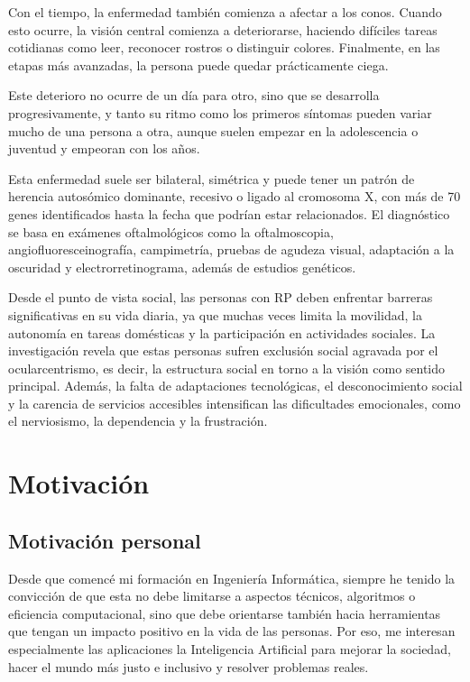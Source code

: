 \documentclass[11pt,spanish,listoffigures,listoftables]{tfgetsinf}
\begin{document}
Con el tiempo, la enfermedad también comienza a afectar a los conos. Cuando esto ocurre, la visión central comienza a deteriorarse, haciendo difíciles tareas cotidianas como leer, reconocer rostros o distinguir colores. Finalmente, en las etapas más avanzadas, la persona puede quedar prácticamente ciega. 

Este deterioro no ocurre de un día para otro, sino que se desarrolla progresivamente, y tanto su ritmo como los primeros síntomas pueden variar mucho de una persona a otra, aunque suelen empezar en la adolescencia o juventud y empeoran con los años. 

Esta enfermedad suele ser bilateral, simétrica y puede tener un patrón de herencia autosómico dominante, recesivo o ligado al cromosoma X, con más de 70 genes identificados hasta la fecha que podrían estar relacionados\cite{GIL}. El diagnóstico se basa en exámenes oftalmológicos como la oftalmoscopia, angiofluoresceinografía, campimetría, pruebas de agudeza visual, adaptación a la oscuridad y electrorretinograma, además de estudios genéticos\cite{VIS}.

Desde el punto de vista social, las personas con RP deben enfrentar barreras significativas en su vida diaria, ya que muchas veces limita la movilidad, la autonomía en tareas domésticas y la participación en actividades sociales. La investigación revela que estas personas sufren exclusión social agravada por el ocularcentrismo, es decir, la estructura social en torno a la visión como sentido principal. Además, la falta de adaptaciones tecnológicas, el desconocimiento social y la carencia de servicios accesibles intensifican las dificultades emocionales, como el nerviosismo, la dependencia y la frustración\cite{DEL}.


\section{Motivación}

\subsection{Motivación personal}
Desde que comencé mi formación en Ingeniería Informática, siempre he tenido la convicción de que esta no debe limitarse a aspectos técnicos, algoritmos o eficiencia computacional, sino que debe orientarse también hacia herramientas que tengan un impacto positivo en la vida de las personas. Por eso, me interesan especialmente las aplicaciones la Inteligencia Artificial para mejorar la sociedad, hacer el mundo más justo e inclusivo y resolver problemas reales.  
\end{document}
